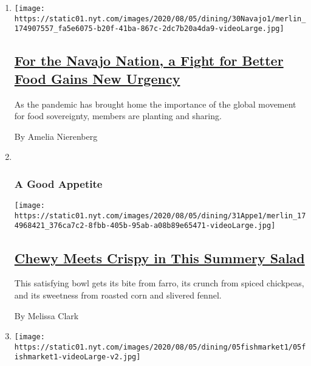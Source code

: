 \begin{enumerate}
\def\labelenumi{\arabic{enumi}.}
\item
  \texttt{[image: https://static01.nyt.com/images/2020/08/05/dining/30Navajo1/merlin\_174907557\_fa5e6075-b20f-41ba-867c-2dc7b20a4da9-videoLarge.jpg]}

  \hypertarget{for-the-navajo-nation-a-fight-for-better-food-gains-new-urgency}{%
  \subsection{\texorpdfstring{\href{/2020/08/03/dining/navajo-nation-food-coronavirus.html}{For
  the Navajo Nation, a Fight for Better Food Gains New
  Urgency}}{For the Navajo Nation, a Fight for Better Food Gains New Urgency}}\label{for-the-navajo-nation-a-fight-for-better-food-gains-new-urgency}}

  As the pandemic has brought home the importance of the global movement
  for food sovereignty, members are planting and sharing.

  By Amelia Nierenberg
\item ~
  \hypertarget{a-good-appetite}{%
  \subsubsection{A Good Appetite}\label{a-good-appetite}}

  \texttt{[image: https://static01.nyt.com/images/2020/08/05/dining/31Appe1/merlin\_174968421\_376ca7c2-8fbb-405b-95ab-a08b89e65471-videoLarge.jpg]}

  \hypertarget{chewy-meets-crispy-in-this-summery-salad}{%
  \subsection{\texorpdfstring{\href{/2020/07/31/dining/farro-corn-chickpea-salad-recipe.html}{Chewy
  Meets Crispy in This Summery
  Salad}}{Chewy Meets Crispy in This Summery Salad}}\label{chewy-meets-crispy-in-this-summery-salad}}

  This satisfying bowl gets its bite from farro, its crunch from spiced
  chickpeas, and its sweetness from roasted corn and slivered fennel.

  By Melissa Clark
\item
  \texttt{[image: https://static01.nyt.com/images/2020/08/05/dining/05fishmarket1/05fishmarket1-videoLarge-v2.jpg]}

  \hypertarget{a-harlem-restaurant-thats-withstood-gentrification-a-pandemic-and-time}{%
}
\end{enumerate}
